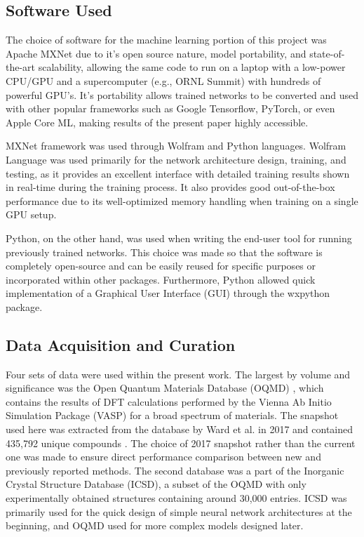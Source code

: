 \subsection{Software Used} \label{sipfenn:sssec:SoftwareUsed}
The choice of software for the machine learning portion of this project was Apache MXNet \cite{ChenMXNet:Systems} due to it's open source nature, model portability, and state-of-the-art scalability, allowing the same code to run on a laptop with a low-power CPU/GPU and a supercomputer (e.g., ORNL Summit) with hundreds of powerful GPU's. It's portability allows trained networks to be converted and used with other popular frameworks such as Google Tensorflow, PyTorch, or even Apple Core ML, making results of the present paper highly accessible.

MXNet framework was used through Wolfram and Python languages. Wolfram Language was used primarily for the network architecture design, training, and testing, as it provides an excellent interface with detailed training results shown in real-time during the training process. It also provides good out-of-the-box performance due to its well-optimized memory handling when training on a single GPU setup. 

Python, on the other hand, was used when writing the end-user tool for running previously trained networks. This choice was made so that the software is completely open-source and can be easily reused for specific purposes or incorporated within other packages. Furthermore, Python allowed quick implementation of a Graphical User Interface (GUI) through the wxpython package.

\subsection{Data Acquisition and Curation} \label{sipfenn:sssec:Data}

Four sets of data were used within the present work. The largest by volume and significance was the Open Quantum Materials Database (OQMD) \cite{Kirklin2015TheEnergies, Saal2013MaterialsOQMD}, which contains the results of DFT calculations performed by the Vienna Ab Initio Simulation Package (VASP) \cite{Kresse1993AbMetals} for a broad spectrum of materials. The snapshot used here was extracted from the database by Ward et al. in 2017 and contained 435,792 unique compounds \cite{Ward2017IncludingTessellations}. The choice of 2017 snapshot rather than the current one was made to ensure direct performance comparison between new and previously reported methods. The second database was a part of the Inorganic Crystal Structure Database (ICSD), a subset of the OQMD with only experimentally obtained structures containing around 30,000 entries. ICSD was primarily used for the quick design of simple neural network architectures at the beginning, and OQMD used for more complex models designed later. 


